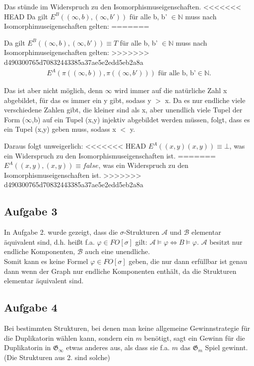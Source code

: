 \documentclass[a4paper,10pt]{article}
\begin{document}
	Das stünde im Widerspruch zu den Isomorphismuseigenschaften.
<<<<<<< HEAD
	Da gilt $E^B((\infty, b),(\infty, b'))$ für alle b, b' $\in \mathbb{N}$ muss nach Isomorphimuseigenschaften gelten:
=======
	
	Da gilt $E^B((\infty, b),(\infty, b')) \equiv T$ für alle b, b' $\in \mathbb{N}$ muss nach Isomorphimuseigenschaften gelten:
>>>>>>> d490300765d70832443385a37ae5e2edd5eb2a8a
	\begin{align*}
		E^A(\pi((\infty, b)),\pi((\infty, b'))) \text{ für alle b, b'} \in \mathbb{N}. 
	\end{align*}
	
	Das ist aber nicht möglich, denn $\infty$ wird immer auf die natürliche Zahl x abgebildet, für das es immer ein y gibt, sodass y $>$ x. 
	Da es nur endliche viele verschiedene Zahlen gibt, die kleiner sind als x, aber unendlich viele Tupel der Form ($\infty$,b) auf ein Tupel 			(x,y) injektiv abgebildet werden müssen, folgt, dass es ein Tupel (x,y) geben muss, sodass x $<$ y.
	
	Daraus folgt unweigerlich:
<<<<<<< HEAD
	$E^A((x,y)(x,y)) \equiv \bot$, was ein Widerspruch zu den Isomorphismuseigenschaften ist.
=======
	$E^A((x,y),(x,y)) \equiv false$, was ein Widerspruch zu den Isomorphismuseigenschaften ist.
>>>>>>> d490300765d70832443385a37ae5e2edd5eb2a8a
	
	
\subsection*{Aufgabe 3}
In Aufgabe 2. wurde gezeigt, dass die $\sigma$-Strukturen $\mathcal{A}$ und $\mathcal{B}$ elementar äquivalent sind, d.h. heißt f.a. $\varphi \in FO[\sigma]$ gilt: $\mathcal{A} \vDash \varphi \Leftrightarrow B \vDash \varphi$. $\mathcal{A}$ besitzt nur endliche Komponenten, $\mathcal{B}$ auch eine unendliche. \\Somit kann es keine Formel $\varphi \in FO[\sigma]$ geben, die nur dann erfüllbar ist genau dann wenn der Graph nur endliche Komponenten enthält, da die Strukturen elementar äquivalent sind.


\subsection*{Aufgabe 4}

Bei bestimmten Strukturen, bei denen man keine allgemeine Gewinnstrategie für die Duplikatorin wählen kann, sondern ein $m$ benötigt, sagt ein Gewinn für die Duplikatorin in $\mathfrak{G}_{\infty}$ etwas anderes aus, als dass sie f.a. $m $ das $\mathfrak{G}_m$ Spiel gewinnt. (Die Strukturen aus 2. sind solche) \\
\end{document}
